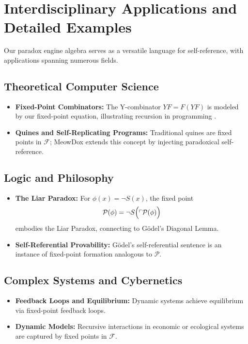 \documentclass[12pt]{amsart}
\theoremstyle{plain}
\theoremstyle{definition}
\theoremstyle{remark}
\begin{document}
\section{Interdisciplinary Applications and Detailed Examples}

Our paradox engine algebra serves as a versatile language for self-reference, with applications spanning numerous fields.

\subsection{Theoretical Computer Science}
\begin{itemize}
    \item \textbf{Fixed-Point Combinators:} The Y-combinator $Y F = F (Y F)$ is modeled by our fixed-point equation, illustrating recursion in programming \cite{Barendregt1984}.
    \item \textbf{Quines and Self-Replicating Programs:} Traditional quines are fixed points in $\mathcal{F}$; MeowDox extends this concept by injecting paradoxical self-reference.
\end{itemize}

\subsection{Logic and Philosophy}
\begin{itemize}
    \item \textbf{The Liar Paradox:} For $\phi(x) = \neg S(x)$, the fixed point
    \[
    \mathcal{P}(\phi) = \neg S\Bigl(\ulcorner \mathcal{P}(\phi) \Bigr)
    \]
    embodies the Liar Paradox, connecting to Gödel’s Diagonal Lemma.
    \item \textbf{Self-Referential Provability:} Gödel’s self-referential sentence is an instance of fixed-point formation analogous to $\mathcal{P}$.
\end{itemize}

\subsection{Complex Systems and Cybernetics}
\begin{itemize}
    \item \textbf{Feedback Loops and Equilibrium:} Dynamic systems achieve equilibrium via fixed-point feedback loops.
    \item \textbf{Dynamic Models:} Recursive interactions in economic or ecological systems are captured by fixed points in $\mathcal{F}$.
\end{itemize}
\end{document}
